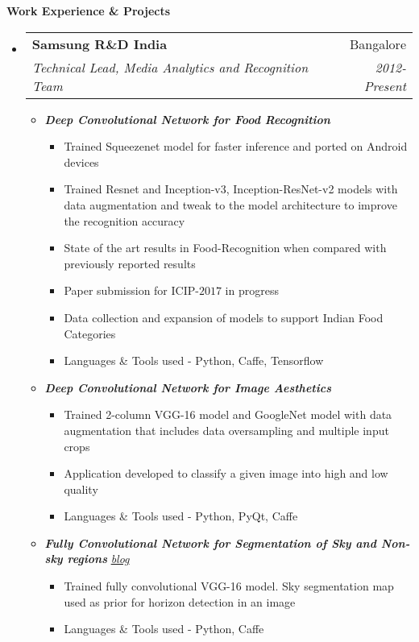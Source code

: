 \documentclass[letterpaper,11pt]{article}
\makeatletter
\newcommand{\resitem}[1]{\item #1 \vspace{-2pt}}
\newcommand{\resheading}[1]{{\large \colorbox{mygrey}{\begin{minipage}{\textwidth}{\textbf{#1 \vphantom{p\^{E}}}}\end{minipage}}}}
\newcommand{\ressubheading}[4]{
	\begin{tabular*}{7.0in}{l@{\extracolsep{\fill}}r}
		\textbf{#1} & #2 \\
		\textit{#3} & \textit{#4} \\
	\end{tabular*}\vspace{-6pt}}
\makeatother
\begin{document}
\resheading{Work Experience \& Projects}
\begin{itemize}
	\item
		\ressubheading{Samsung R\&D India}{Bangalore}{Technical Lead, Media Analytics and Recognition Team}{2012-Present}
		\vspace{4mm}
		\begin{itemize}
				\resitem[]{\faCircleO
					\hspace{1mm}\textbf{\emph{Deep Convolutional Network for Food Recognition}}\hspace{1mm}}
				\begin{itemize}
						\resitem{Trained Squeezenet model for faster inference and ported on Android devices}
						\resitem{Trained Resnet and Inception-v3, Inception-ResNet-v2 models with data augmentation and tweak to the model architecture to improve the recognition accuracy}
						\resitem{State of the art results in Food-Recognition when compared with previously reported results}
						\resitem{Paper submission for ICIP-$2017$ in progress}
						\resitem{Data collection and expansion of models to support Indian Food Categories}
						\resitem{Languages \& Tools used - Python, Caffe, Tensorflow}
				\end{itemize}
				\vspace{2.5mm}
				\resitem[]{\faCircleO
					\hspace{1mm}\textbf{\emph{Deep Convolutional Network for Image Aesthetics}}\hspace{1mm}}
				\begin{itemize}
						\resitem{Trained 2-column VGG-16 model and GoogleNet model with data augmentation that includes data oversampling and multiple input crops}
						\resitem{Application developed to classify a given image into high and low quality}
						\resitem{Languages \& Tools used - Python, PyQt, Caffe}
				\end{itemize}
				\vspace{2.5mm}
				\resitem[]{\faCircleO
					\hspace{1mm}\textbf{\emph{Fully Convolutional Network for Segmentation of Sky and Non-sky regions}}\hspace{1mm}
					\faGlobe \hspace{1mm} \href{https://nrupatunga.github.io/fcn-segmentation/}{\emph{blog}}}
				\begin{itemize}
						\resitem{Trained fully convolutional VGG-16 model. Sky segmentation map used as prior for horizon detection in an image}
						\resitem{Languages \& Tools used - Python, Caffe}

\end{itemize}
\end{itemize}
\end{itemize}
\end{document}
